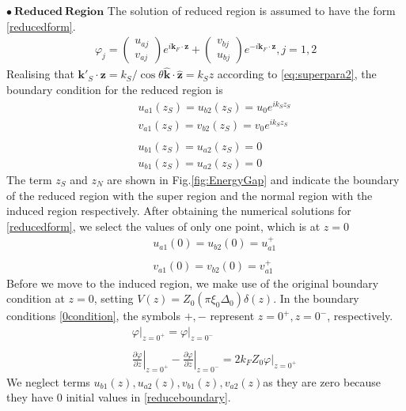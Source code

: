 $\mathbf{\bullet \ Reduced \ Region}$
The solution of reduced region is assumed to have the form \eqref{reducedform}.
\begin{eqnarray}\label{reducedform}
\varphi_j=
\left(
\begin{array}{c}
 u_{aj}\\
 v_{aj}
 \end{array}\right)e^{i\mathbf{k}_F\cdot\mathbf{z}}+
 \left(
\begin{array}{c}
 v_{bj}\\
 u_{bj}
 \end{array}\right)e^{-i \mathbf{k}_F\cdot\mathbf{z}},j=1,2
\end{eqnarray}
Realising that $\mathbf{k}'_S\cdot\mathbf{z}=k_S/\cos\theta\widehat{\mathbf{k}}\cdot\widehat{\mathbf{z}}=k_Sz$ according to \eqref{eq:superpara2}, the boundary condition for the reduced region is
\begin{eqnarray}\label{reduceboundary}
&&u_{a1}(z_S)=u_{b2}(z_S)=u_0 e^{ik_Sz_S}\nonumber\\
&&v_{a1}(z_S)=v_{b2}(z_S)=v_0 e^{ik_Sz_S}\nonumber\\
&&\\
&&u_{b1}(z_S)=u_{a2}(z_S)=0\nonumber\\
&&u_{b1}(z_S)=u_{a2}(z_S)=0\nonumber
\end{eqnarray}
The term $z_S$ and $z_N$ are shown in Fig.\ref{fig:EnergyGap} and indicate the boundary of the reduced region with the super region and the normal region with the induced region respectively.
After obtaining the numerical solutions for \eqref{reducedform}, we select the values of only one point, which is at $z=0$
\begin{eqnarray}
&&u_{a1}(0)=u_{b2}(0)=u_{a1}^+\nonumber\\
\\
&&v_{a1}(0)=v_{b2}(0)=v_{a1}^+\nonumber
\end{eqnarray}
Before we move to the induced region, we make use of the original boundary condition at $z=0$, setting $V(z)=Z_0(\pi\xi_0\Delta_0)\delta(z)$.  In the boundary conditions \eqref{0condition}, the symbols $+,-$ represent $z=0^+,z=0^-$, respectively.
\begin{eqnarray}\label{0condition}
&&\left.\varphi\right|_{z=0^+}=\left.\varphi\right|_{z=0^-}\nonumber\\
\\
&&\left.\frac{\partial \varphi}{\partial z}\right|_{z=0^+}-\left.\frac{\partial \varphi}{\partial z}\right|_{z=0^-}=\left.2k_FZ_0\varphi\right|_{z=0^+}\nonumber
\end{eqnarray}
We neglect terms $u_{b1}(z), u_{a2}(z), v_{b1}(z), v_{a2}(z)$as they are zero because they have $0$ initial values in \eqref{reduceboundary}. 

